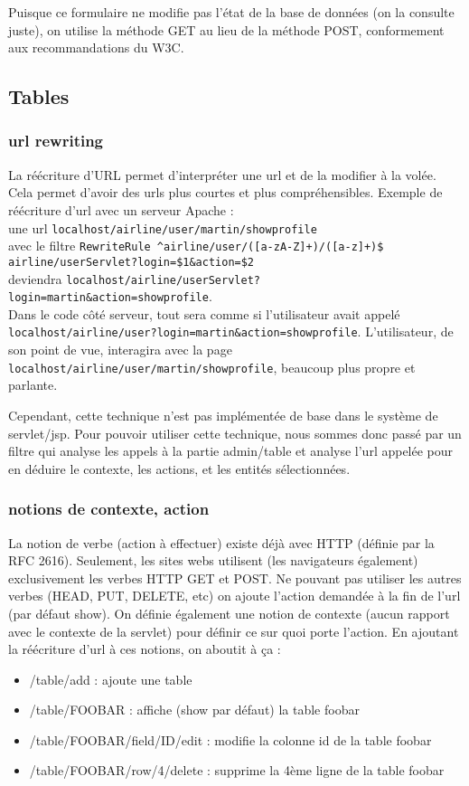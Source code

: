 Puisque ce formulaire ne modifie pas l'état de la base de données (on la consulte juste), on utilise la méthode GET au lieu de la méthode POST, conformement aux recommandations du W3C.

\subsection{Tables}

\subsubsection{url rewriting}
La réécriture d'URL permet d'interpréter une url et de la modifier à la volée. Cela permet d'avoir des urls plus courtes et plus compréhensibles. Exemple de réécriture d'url avec un serveur Apache :
~\\
une url \verb|localhost/airline/user/martin/showprofile|\\
avec le filtre \verb|RewriteRule ^airline/user/([a-zA-Z]+)/([a-z]+)$ airline/userServlet?login=$1&action=$2|\\
 deviendra \verb|localhost/airline/userServlet?login=martin&action=showprofile|.\\
Dans le code côté serveur, tout sera comme si l'utilisateur avait appelé \verb|localhost/airline/user?login=martin&action=showprofile|. L'utilisateur, de son point de vue, interagira avec la page \verb|localhost/airline/user/martin/showprofile|, beaucoup plus propre et parlante.

Cependant, cette technique n'est pas implémentée de base dans le système de servlet/jsp. Pour pouvoir utiliser cette technique, nous sommes donc passé par un filtre qui analyse les appels à la partie admin/table et analyse l'url appelée pour en déduire le contexte, les actions, et les entités sélectionnées.

\subsubsection{notions de contexte, action}
La notion de verbe (action à effectuer) existe déjà avec HTTP (définie par la RFC 2616). Seulement, les sites webs utilisent (les navigateurs également) exclusivement les verbes HTTP GET et POST. Ne pouvant pas utiliser les autres verbes (HEAD, PUT, DELETE, etc) on ajoute l'action demandée à la fin de l'url (par défaut show). On définie également une notion de contexte (aucun rapport avec le contexte de la servlet) pour définir ce sur quoi porte l'action. En ajoutant la réécriture d'url à ces notions, on aboutit à ça :
\begin{itemize}
	\item{/table/add} : ajoute une table
	\item{/table/FOOBAR} : affiche (show par défaut) la table foobar
	\item{/table/FOOBAR/field/ID/edit} : modifie la colonne id de la table foobar
	\item{/table/FOOBAR/row/4/delete} :  supprime la 4ème ligne de la table foobar
\end{itemize}

